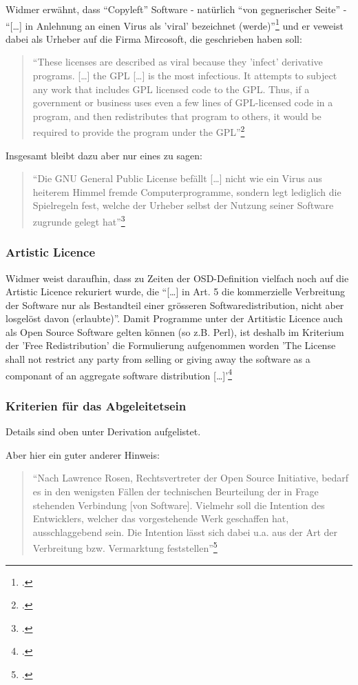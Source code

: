 \documentclass[DIV=calc,BCOR=5mm,11pt,headings=small,oneside,abstract=true, toc=bib]{scrartcl}
\begin{document}
Widmer erwähnt, dass \enquote{Copyleft} Software - natürlich \enquote{von
gegnerischer Seite} - \enquote{[\ldots] in Anlehnung an einen Virus
als 'viral' bezeichnet (werde)}\footcite[][137]{Widmer2003a} und er
veweist dabei als Urheber auf die Firma Mircosoft, die geschrieben haben soll: 

\begin{quote} \enquote{These licenses are described as viral because they
'infect' derivative programs. [\ldots] the GPL [\ldots] is the most
infectious. It attempts to subject any work that includes GPL licensed
code to the GPL. Thus, if a government or business uses even a few lines
of GPL-licensed code in a program, and then redistributes that program to
others, it would be required to provide the program under the
GPL}\footcite[zit. nach][137. Original unter
htto://www.microsoft.com/licensing/sharedsource/ssfaq.asp]{Widmer2003a}
\end{quote}

Insgesamt bleibt dazu aber nur eines zu sagen:
\begin{quote}
\enquote{Die GNU General Public License befällt [\ldots] nicht wie ein
Virus aus heiterem Himmel fremde Computerprogramme, sondern legt
lediglich die Spielregeln fest, welche der Urheber selbst der Nutzung
seiner Software zugrunde gelegt hat}\footcite[][183]{Widmer2003a}
\end{quote}

\subsubsection{Artistic Licence}
Widmer weist daraufhin, dass zu Zeiten der OSD-Definition vielfach noch auf die
Artistic Licence rekuriert wurde, die \enquote{[\ldots] in Art. 5 die
kommerzielle Verbreitung der Software nur als Bestandteil einer grösseren
Softwaredistribution, nicht aber losgelöst davon (erlaubte)}. Damit
Programme unter der Artitistic Licence auch als Open Source Software gelten
können (so z.B. Perl), ist deshalb im Kriterium der 'Free Redistribution' die
Formulierung aufgenommen worden 'The License shall not restrict any party from
selling or giving away the software as a componant of an aggregate software
distribution [\ldots]'\footcite[vgl.][21 insbesonder auch Anm 74]{Widmer2003a}

\subsubsection{Kriterien für das Abgeleitetsein}
Details sind oben unter Derivation aufgelistet.

Aber hier ein guter anderer Hinweis: 
\begin{quote} \enquote{Nach Lawrence Rosen, Rechtsvertreter der Open Source
Initiative, bedarf es in den wenigsten Fällen der technischen Beurteilung
der in Frage stehenden Verbindung [von Software]. Vielmehr soll die
Intention des Entwicklers, welcher das vorgestehende Werk geschaffen hat,
ausschlaggebend sein. Die Intention lässt sich dabei u.a. aus der Art der
Verbreitung bzw. Vermarktung feststellen}\footcite[vgl.][140]{Widmer2003a}
\end{quote}

\small

\end{document}
